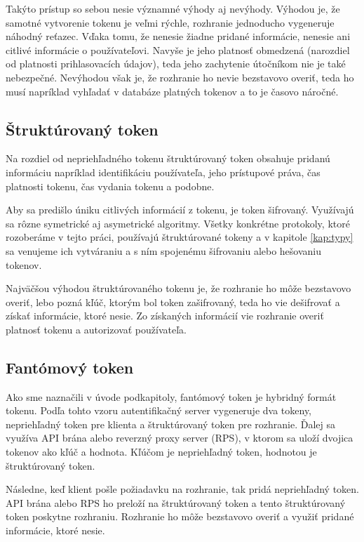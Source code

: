 Takýto prístup so sebou nesie významné výhody aj nevýhody. Výhodou je, že samotné vytvorenie tokenu je veľmi rýchle, rozhranie jednoducho vygeneruje náhodný reťazec. Vďaka tomu, že nenesie žiadne pridané informácie, nenesie ani citlivé informácie o používateľovi. Navyše je jeho platnosť obmedzená (narozdiel od platnosti prihlasovacích údajov), teda jeho zachytenie útočníkom nie je také nebezpečné. Nevýhodou však je, že rozhranie ho nevie bezstavovo overiť, teda ho musí napríklad vyhľadať v databáze platných tokenov a to je časovo náročné.


\subsection{Štruktúrovaný token}


Na rozdiel od nepriehľadného tokenu štruktúrovaný token obsahuje pridanú informáciu napríklad identifikáciu používateľa, jeho prístupové práva, čas platnosti tokenu, čas vydania tokenu a podobne.

Aby sa predišlo úniku citlivých informácií z tokenu, je token šifrovaný. Využívajú sa rôzne symetrické aj asymetrické algoritmy. Všetky konkrétne protokoly, ktoré rozoberáme v tejto práci, používajú štruktúrované tokeny a v kapitole \ref{kap:typy} sa venujeme ich vytváraniu a s ním spojenému šifrovaniu alebo hešovaniu tokenov.

Najväčšou výhodou štruktúrovaného tokenu je, že rozhranie ho môže bezstavovo overiť, lebo pozná kľúč, ktorým bol token zašifrovaný, teda ho vie dešifrovať a získať informácie, ktoré nesie. Zo získaných informácií vie rozhranie overiť platnosť tokenu a autorizovať používateľa.


\subsection{Fantómový token}

Ako sme naznačili v úvode podkapitoly, fantómový token \cite{phantom_token} je hybridný formát tokenu. Podľa tohto vzoru autentifikačný server vygeneruje dva tokeny, nepriehľadný token pre klienta a štruktúrovaný token pre rozhranie. Ďalej sa využíva API brána alebo reverzný proxy server (RPS), v ktorom sa uloží dvojica tokenov ako kľúč a hodnota. Kľúčom je nepriehľadný token, hodnotou je štruktúrovaný token.

Následne, keď klient pošle požiadavku na rozhranie, tak pridá nepriehľadný token. API brána alebo RPS ho preloží na štruktúrovaný token a tento štruktúrovaný token poskytne rozhraniu. Rozhranie ho môže bezstavovo overiť a využiť pridané informácie, ktoré nesie.

